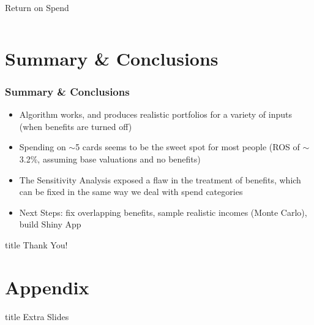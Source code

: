 \begin{frame}{Return on Spend}
\begin{columns}[c]
\begin{column}{0.5\textwidth}
        \end{column}
    \end{columns}
\end{frame} 

\section{Summary \& Conclusions}


\begin{frame}
    \frametitle{Summary \& Conclusions}
    \begin{itemize}
        \item Algorithm works, and produces realistic portfolios for a variety of inputs (when benefits are turned off)
        \bigskip
        \item Spending on $\sim$5 cards seems to be the sweet spot for most people (ROS of $\sim$3.2\%, assuming base valuations and no benefits)
        \bigskip
        \item The Sensitivity Analysis exposed a flaw in the treatment of benefits, which can be fixed in the same way we deal with spend categories
        \bigskip
        \item Next Steps: fix overlapping benefits, sample realistic incomes (Monte Carlo), build Shiny App
    \end{itemize}
\end{frame}

\begin{frame}
    \vfill
    \centering
    \begin{beamercolorbox}[sep=8pt,center,shadow=true,rounded=true]{title}
      Thank You!
    \end{beamercolorbox}
    \vfill
\end{frame}

\section*{Appendix}

\begin{frame}
    \vfill
    \centering
    \begin{beamercolorbox}[sep=8pt,center,shadow=true,rounded=true]{title}
      Extra Slides
    \end{beamercolorbox}
    \vfill
\end{frame}



